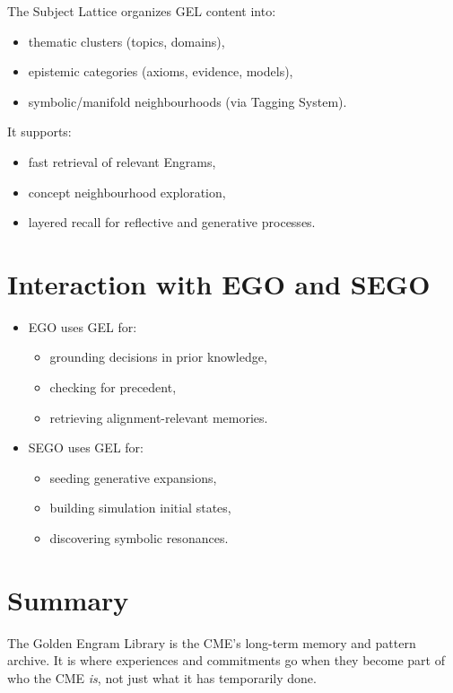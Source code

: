 The Subject Lattice organizes GEL content into:
\begin{itemize}
    \item thematic clusters (topics, domains),
    \item epistemic categories (axioms, evidence, models),
    \item symbolic/manifold neighbourhoods (via Tagging System).
\end{itemize}

It supports:
\begin{itemize}
    \item fast retrieval of relevant Engrams,
    \item concept neighbourhood exploration,
    \item layered recall for reflective and generative processes.
\end{itemize}

\section{Interaction with EGO and SEGO}

\begin{itemize}
    \item EGO uses GEL for:
          \begin{itemize}
              \item grounding decisions in prior knowledge,
              \item checking for precedent,
              \item retrieving alignment-relevant memories.
          \end{itemize}
    \item SEGO uses GEL for:
          \begin{itemize}
              \item seeding generative expansions,
              \item building simulation initial states,
              \item discovering symbolic resonances.
          \end{itemize}
\end{itemize}

\section{Summary}

The Golden Engram Library is the CME’s long-term memory and pattern archive.
It is where experiences and commitments go when they become part of who the CME
\emph{is}, not just what it has temporarily done.
